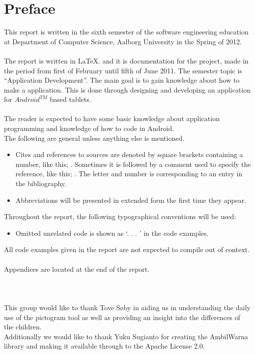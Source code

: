 \chapter*{Preface}
This report is written in the sixth semester of the software engineering education at Department of Computer Science, Aalborg University in the Spring of 2012.  \\
\\
The report is written in \LaTeX. and it is documentation for the project, made in the period from first of February until fifth of June 2011.
The semester topic is ``Application Development''. The main goal is to gain knowledge about how to make a application. This is done through designing and developing an application for $Android^{TM}$ based tablets.\\
\\
The reader is expected to have some basic knowledge about application programming and knowledge of how to code in Android. \\
The following are general unless anything else is mentioned.

\begin{itemize}
\item Cites and references to sources are denoted by square brackets containing a number,  like this; \cite{XP}. Sometimes it is followed by a comment used to specify the reference, like this; \cite[Comment]{XP}. The letter and number is corresponding to an entry in the bibliography. 
\item Abbreviations will be presented in extended form the first time they appear. 
\end{itemize}

Throughout the report, the following typographical conventions will be used:
 
\begin{itemize}
\item Omitted unrelated code is shown as `. . . ’ in the code examples.
\end{itemize}

All code examples given in the report are not expected to compile out of context.\\
\\
Appendices are located at the end of the report. \\ \\  \\ \\

This group would like to thank Tove S\o{}by in aiding us in understanding the daily use of the pictogram tool as well as providing an insight into the differences of the children.\\
Additionally we would like to thank Yuku Sugianto for creating the AmbilWarna library and making it available through to the Apache License 2.0. \cite{ambilw} 

